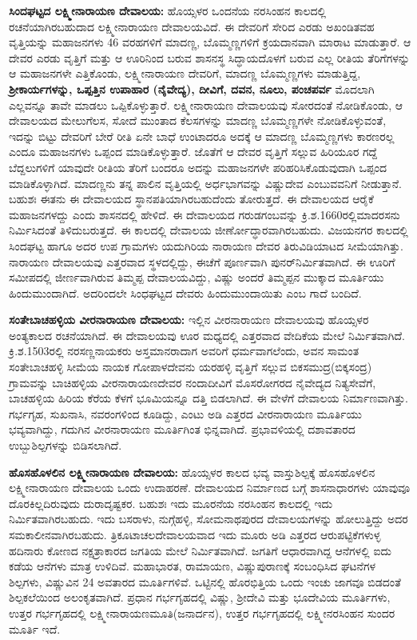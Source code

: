 \textbf{ಸಿಂದಘಟ್ಟದ ಲಕ್ಷ್ಮೀನಾರಾಯಣ ದೇವಾಲಯ:} ಹೊಯ್ಸಳರ ಒಂದನೆಯ ನರಸಿಂಹನ ಕಾಲದಲ್ಲಿ ರಚನೆಯಾಗಿರಬಹುದಾದ ಲಕ್ಷ್ಮೀನಾರಾಯಣ ದೇವಾಲಯವಿದೆ. ಈ ದೇವರಿಗೆ ಸೇರಿದ ಎರಡು ಅಖಂಡಿತವಹ ವೃತ್ತಿಯನ್ನು ಮಹಾಜನಗಳು 46 ವರಹಗಳಿಗೆ ಮಾದಣ್ಣ, ಬೊಮ್ಮಣ್ಣಗಳಿಗೆ ಕ್ರಯದಾನವಾಗಿ ಮಾರಾಟ ಮಾಡುತ್ತಾರೆ. ಆ ದೇವರ ಎರಡು ವೃತ್ತಿಗೆ ಮತ್ತು ಆ ಊರಿನಿಂದ ಬರುವ ಶಾಸನಸ್ಥ ಸಿದ್ಧಾಯದೊಳಗೆ ಬರುವ ಎಲ್ಲ ರೀತಿಯ ತೆರಿಗೆಗಳನ್ನು ಆ ಮಹಾಜನಗಳೇ ಎತ್ತಿಕೊಂಡು, ಲಕ್ಷ್ಮೀನಾರಾಯಣ ದೇವರಿಗೆ, ಮಾದಣ್ಣ ಬೊಮ್ಮಣ್ಣಗಳು ಮಾಡುತ್ತಿದ್ದ, \textbf{ಶ‍್ರೀಕಾರ್ಯಗಳನ್ನು, ಒಪ್ಪತ್ತಿನ ಉಪಾಹಾರ (ನೈವೇದ್ಯ), ದೀವಿಗೆ, ದವನ, ನೂಲು, ಪಂಚಪರ್ವ }ಮೊದಲಾಗಿ ಎಲ್ಲವನ್ನೂ ತಾವೇ ಮಾಡಲು ಒಪ್ಪಿಕೊಳ್ಳುತ್ತಾರೆ. ಲಕ್ಷ್ಮೀನಾರಾಯಣ ದೇವಾಲಯವು ಸೋರದಂತೆ ನೋಡಿಕೊಂಡು, ಆ ದೇವಾಲಯದ ಮೇಲುಗೆಲಸ, ಸೋದೆ ಮುಂತಾದ ಕೆಲಸಗಳನ್ನು ಮಾದಣ್ಣ ಬೊಮ್ಮಣ್ಣಗಳೇ ನೋಡಿಕೊಳ್ಳುವಂತೆ, ಇದನ್ನು ಬಿಟ್ಟು ದೇವರಿಗೆ ಬೇರೆ ರೀತಿ ಏನೇ ಬಾಧೆ ಉಂಟಾದರೂ ಅದಕ್ಕೆ ಆ ಮಾದಣ್ಣ ಬೊಮ್ಮಣ್ಣಗಳು ಕಾರಣರಲ್ಲ ಎಂದೂ ಮಹಾಜನಗಳು ಒಪ್ಪಂದ ಮಾಡಿಕೊಳ್ಳುತ್ತಾರೆ. ಜೊತೆಗೆ ಆ ದೇವರ ವೃತ್ತಿಗೆ ಸಲ್ಲುವ ಹಿರಿಯೂರ ಗದ್ದೆ ಬೆದ್ದಲುಗಳಿಗೆ ಯಾವುದೇ ರೀತಿಯ ತೆರಿಗೆ ಬಂದರೂ ಅದನ್ನು ಮಹಾಜನಗಳೇ ಪರಿಹರಿಸಿಕೊಡುವುದಾಗಿ ಒಪ್ಪಂದ ಮಾಡಿಕೊಳ್ಳಾಗಿದೆ. ಮಾದಣ್ಣನು ತನ್ನ ಪಾಲಿನ ವೃತ್ತಿಯಲ್ಲಿ ಅರ್ಧಭಾಗವನ್ನು ವಿಷ್ಣುದೇವ ಎಂಬುವವನಿಗೆ ನೀಡುತ್ತಾನೆ. ಬಹುಶಃ ಈತನು ಈ ದೇವಾಲಯದ ಸ್ಥಾನಪತಿಯಾಗಿರಬಹುದೆಂದು ತೋರುತ್ತದೆ. ಈ ದೇವಾಲಯದ ಆರೈಕೆ ಮಹಾಜನಗಳದ್ದು ಎಂದು ಶಾಸನದಲ್ಲಿ ಹೇಳಿದೆ. ಈ ದೇವಾಲಯದ ಗರುಡಗಂಬವನ್ನು ಕ್ರಿ.ಶ.1660ರಲ್ಲಿಮಾದರಸನು ನಿರ್ಮಿಸಿದಂತೆ ತಿಳಿದುಬರುತ್ತದೆ. ಈ ಕಾಲದಲ್ಲಿ ದೇವಾಲಯ ಜೀರ್ಣೋದ್ಧಾರವಾಗಿರಬಹುದು. ವಿಜಯನಗರ ಕಾಲದಲ್ಲಿ ಸಿಂದಘಟ್ಟ ಹಾಗೂ ಅದರ ಉಪ ಗ್ರಾಮಗಳು ಯದುಗಿರಿಯ ನಾರಾಯಣ ದೇವರ ತಿರುವಿಡಿಯಾಟದ ಸೀಮೆಯಾಗಿತ್ತು. ನಾರಾಯಣ ದೇವಾಲಯವು ಎತ್ತರವಾದ ಸ್ಥಳದಲ್ಲಿದ್ದು, ಈಚೆಗೆ ಪೂರ್ಣವಾಗಿ ಪುನರ್​ನಿರ್ಮಿತವಾಗಿದೆ. ಈ ಊರಿಗೆ ಸಮೀಪದಲ್ಲಿ ಜೀರ್ಣವಾಗಿರುವ ತಿಮ್ಮಪ್ಪ ದೇವಾಲಯವಿದ್ದು, ವಿಷ್ಣು ಅಂದರೆ ತಿಮ್ಮಪ್ಪನ ಮುಕ್ಕಾದ ಮೂರ್ತಿಯು ಹಿಂದುಮುಂದಾಗಿದೆ. ಅದರಿಂದಲೇ ಸಿಂಧಘಟ್ಟದ ದೇವರು ಹಿಂದುಮುಂದಾಯಿತು ಎಂಬ ಗಾದೆ ಬಂದಿದೆ.

\textbf{ಸಂತೇಬಾಚಹಳ್ಳಿಯ ವೀರನಾರಾಯಣ ದೇವಾಲಯ:} ಇಲ್ಲಿನ ವೀರನಾರಾಯಣ ದೇವಾಲಯವು ಹೊಯ್ಸಳರ ಅಂತ್ಯಕಾಲದ ರಚನೆಯಾಗಿದೆ. ಈ ದೇವಾಲಯವು ಊರ ಮಧ್ಯದಲ್ಲಿ ಎತ್ತರವಾದ ವೇದಿಕೆಯ ಮೇಲೆ ನಿರ್ಮಿತವಾಗಿದೆ. ಕ್ರಿ.ಶ.1503ರಲ್ಲಿ ನರಸಣ್ಣನಾಯಕರು ಅಸ್ತಮಾನರಾದಾಗ ಅವರಿಗೆ ಧರ್ಮವಾಗಲೆಂದು, ಅವನ ಸಾಮಂತ ಸಂತೇಬಾಚಹಳ್ಳಿ ಸೀಮೆಯ ನಾಯಕ ಗೋಪಾಳದೇವನು ಯರಹಳ್ಳಿ ವೃತ್ತಿಗೆ ಸಲ್ಲುವ ಬಿಕಸಮುದ್ರ(ಬಿಕ್ಕಸಂದ್ರ) ಗ್ರಾಮವನ್ನು ಬಾಚಿಹಳ್ಳಿಯ ವೀರನಾರಾಯಣದೇವರ ನಂದಾದೀವಿಗೆ ಮೊಸರೋಗರದ ನೈವೇದ್ಯದ ನಿತ್ಯಸೇವೆಗೆ, ಬಾಚಹಳ್ಳಿಯ ಹಿರಿಯ ಕೆರೆಯ ಕೆಳಗೆ ಭೂಮಿಯನ್ನೂ ದತ್ತಿ ಬಿಡಲಾಗಿದೆ. ಈ ವೇಳೆಗೆ ದೇವಾಲಯ ನಿರ್ಮಾಣವಾಗಿತ್ತು. ಗರ್ಭಗೃಹ, ಸುಖನಾಸಿ, ನವರಂಗಳಿಂದ ಕೂಡಿದ್ದು, ಎಂಟು ಅಡಿ ಎತ್ತರದ ವೀರನಾರಾಯಣ ಮೂರ್ತಿಯು ಭವ್ಯವಾಗಿದ್ದು, ಗದುಗಿನ ವೀರನಾರಾಯಣ ಮೂರ್ತಿಗಿಂತ ಭಿನ್ನವಾಗಿದೆ. ಪ್ರಭಾವಳಿಯಲ್ಲಿ ದಶಾವತಾರದ ಉಬ್ಬುಶಿಲ್ಪಗಳನ್ನು ಬಿಡಿಸಲಾಗಿದೆ. 

\textbf{ಹೊಸಹೊಳಲಿನ ಲಕ್ಷ್ಮೀನಾರಾಯಣ ದೇವಾಲಯ:} ಹೊಯ್ಸಳರ ಕಾಲದ ಭವ್ಯ ವಾಸ್ತುಶಿಲ್ಪಕ್ಕೆ ಹೊಸಹೊಳಲಿನ ಲಕ್ಷ್ಮೀನಾರಾಯಣ ದೇವಾಲಯ ಒಂದು ಉದಾಹರಣೆ. ದೇವಾಲಯದ ನಿರ್ಮಾಣದ ಬಗ್ಗೆ ಶಾಸನಾಧಾರಗಳು ಯಾವುವೂ ದೊರಕಿಲ್ಲದಿರುವುದು ದುರಾದೃಷ್ಟಕರ. ಬಹುಶಃ ಇದು ಮೂರನೆಯ ನರಸಿಂಹನ ಕಾಲದಲ್ಲಿ ಇದು ನಿರ್ಮಿತವಾಗಿರಬಹುದು. ಇದು ಬಸರಾಳು, ನುಗ್ಗೆಹಳ್ಳಿ, ಸೋಮನಾಥಪುರದ ದೇವಾಲಯಗಳನ್ನು ಹೋಲುತ್ತಿದ್ದು ಅದರ ಸಮಕಾಲೀನವಾಗಿರಬಹುದು. ತ್ರಿಕೂಟಾಚಲದೇವಾಲಯವಾದ ಇದು ಮೂರು ಅಡಿ ಎತ್ತರದ ಆರುಪಟ್ಟಿಕೆಗಳುಳ್ಳ ಹದಿನಾರು ಕೋಣದ ನಕ್ಷತ್ರಾಕಾರದ ಜಗತಿಯ ಮೇಲೆ ನಿರ್ಮಿತವಾಗಿದೆ. ಜಗತಿಗೆ ಆಧಾರವಾಗಿದ್ದ ಆನೆಗಳಲ್ಲಿ ಐದು ಕಡೆಯ ಆನೆಗಳು ಮಾತ್ರ ಉಳಿದಿವೆ. ಮಹಾಭಾರತ, ರಾಮಾಯಣ, ವಿಷ್ಣುಪುರಾಣಕ್ಕೆ ಸಂಬಂಧಿಸಿದ ಘಟನೆಗಳ ಶಿಲ್ಪಗಳು, ವಿಷ್ಣುವಿನ 24 ಅವತಾರದ ಮೂರ್ತಿಗಳಿವೆ. ಒಟ್ಟಿನಲ್ಲಿ ಹೊರಭಿತ್ತಿಯ ಒಂದು ಇಂಚು ಜಾಗವೂ ಬಿಡದಂತೆ ಶಿಲ್ಪಕಲೆಯಿಂದ ಅಲಂಕೃತವಾಗಿದೆ. ಪ್ರಧಾನ ಗರ್ಭಗೃಹದಲ್ಲಿ ವಿಷ್ಣು, ಶ‍್ರೀದೇವಿ ಮತ್ತು ಭೂದೇವಿಯ ಮೂರ್ತಿಗಳು, ಉತ್ತರ ಗರ್ಭಗೃಹದಲ್ಲಿ ಲಕ್ಷ್ಮೀನಾರಾಯಣಮೂತಿ(ಜನಾರ್ದನ), ಉತ್ತರ ಗರ್ಭಗೃಹದಲ್ಲಿ ಲಕ್ಷ್ಮೀನರಸಿಂಹನ ಸುಂದರ ಮೂರ್ತಿ ಇದೆ. 

